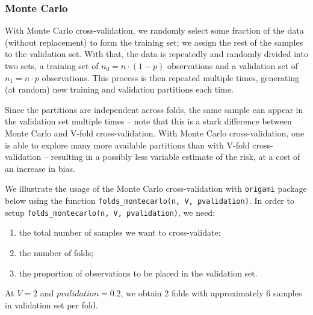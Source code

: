 \documentclass[12pt, krantz2,]{book}
\providecommand{\tightlist}{%
  \setlength{\itemsep}{0pt}\setlength{\parskip}{0pt}}
\theoremstyle{definition}
\theoremstyle{definition}
\theoremstyle{definition}
\newcommand{\1}{\mathbbm{1}}
\begin{document}
\hypertarget{monte-carlo}{%
\subsubsection{Monte Carlo}\label{monte-carlo}}

With Monte Carlo cross-validation, we randomly select some fraction of the data
(without replacement) to form the training set; we assign the rest of the
samples to the validation set. With that, the data is repeatedly and randomly
divided into two sets, a training set of \(n_0 = n \cdot (1-p)\) observations and
a validation set of \(n_1 = n \cdot p\) observations. This process is then
repeated multiple times, generating (at random) new training and validation
partitions each time.

Since the partitions are independent across folds, the same sample can appear in
the validation set multiple times -- note that this is a stark difference
between Monte Carlo and V-fold cross-validation. With Monte Carlo
cross-validation, one is able to explore many more available partitions than
with V-fold cross-validation -- resulting in a possibly less variable estimate
of the risk, at a cost of an increase in bias.

We illustrate the usage of the Monte Carlo cross-validation with \texttt{origami}
package below using the function \texttt{folds\_montecarlo(n,\ V,\ pvalidation)}. In order
to setup \texttt{folds\_montecarlo(n,\ V,\ pvalidation)}, we need:

\begin{enumerate}
\def\labelenumi{\arabic{enumi}.}
\tightlist
\item
  the total number of samples we want to cross-validate;
\item
  the number of folds;
\item
  the proportion of observations to be placed in the validation set.
\end{enumerate}

At \(V=2\) and \(pvalidation=0.2\), we obtain 2 folds with approximately \(6\) samples
in validation set per fold.
\end{document}
